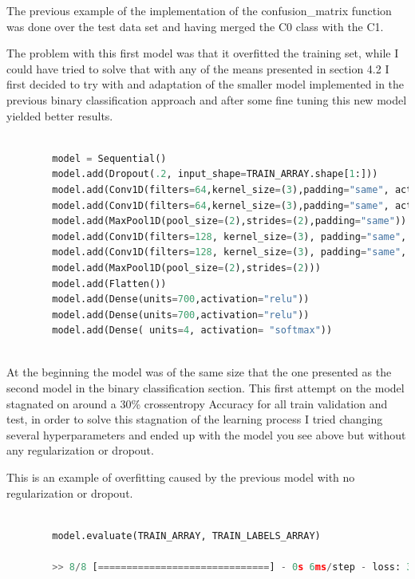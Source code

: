 \documentclass[12pt, a4paper]{article}
\begin{document}
		\vspace{10mm}	
		
	The previous example of the implementation of the confusion\_matrix function was done over the test data set and having merged the C0 class with the C1.
	
	The problem with this first model was that it overfitted the training set, while I could have tried to solve that with any of the means presented in section 4.2 I first decided to try with and adaptation of the smaller model implemented in the previous binary classification approach and after some fine tuning this new model yielded better results.
	
		\clearpage
	
	\begin{lstlisting}[language=Python]
		
		model = Sequential() 
		model.add(Dropout(.2, input_shape=TRAIN_ARRAY.shape[1:]))
		model.add(Conv1D(filters=64,kernel_size=(3),padding="same", activation="relu"))
		model.add(Conv1D(filters=64,kernel_size=(3),padding="same", activation="relu"))
		model.add(MaxPool1D(pool_size=(2),strides=(2),padding="same"))
		model.add(Conv1D(filters=128, kernel_size=(3), padding="same", activation="relu"))
		model.add(Conv1D(filters=128, kernel_size=(3), padding="same", activation="relu"))
		model.add(MaxPool1D(pool_size=(2),strides=(2)))
		model.add(Flatten())
		model.add(Dense(units=700,activation="relu"))
		model.add(Dense(units=700,activation="relu"))
		model.add(Dense( units=4, activation= "softmax"))
		
	\end{lstlisting}
	
	\vspace{10mm}
	
	At the beginning the model was of the same size that the one presented as the second model in the binary classification section. This first attempt on the model stagnated on around a 30\% crossentropy Accuracy for all train validation and test, in order to solve this stagnation of the learning process I tried changing several hyperparameters and ended up with the model you see above but without any regularization or dropout.
	
	This is an example of overfitting caused by the previous model with no regularization or dropout.
	
		\vspace{5mm}
	\begin{lstlisting}[language=Python]
		
		model.evaluate(TRAIN_ARRAY, TRAIN_LABELS_ARRAY)
		
		>> 8/8 [==============================] - 0s 6ms/step - loss: 3.5593e-05 - categorical_accuracy: 1.0000 - accuracy: 0.0914
	\end{lstlisting}
\end{document}
